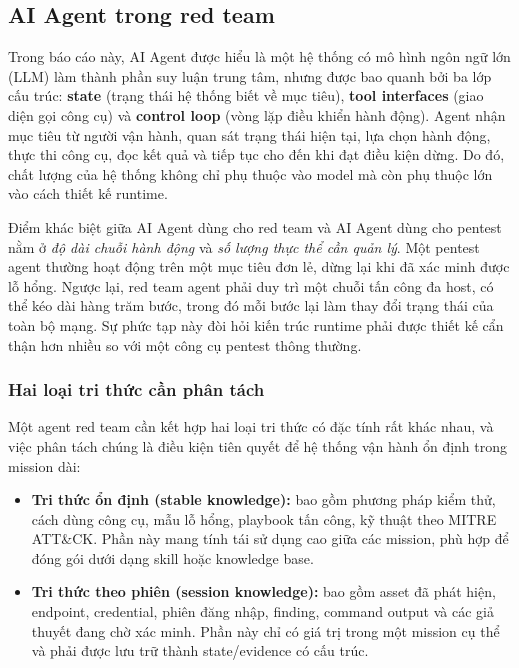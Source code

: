 
\subsection{AI Agent trong red team}
\label{sec:ai-agent-red-team}

Trong báo cáo này, AI Agent được hiểu là một hệ thống có mô hình ngôn ngữ lớn (LLM) làm thành phần suy luận trung tâm, nhưng được bao quanh bởi ba lớp cấu trúc: \textbf{state} (trạng thái hệ thống biết về mục tiêu), \textbf{tool interfaces} (giao diện gọi công cụ) và \textbf{control loop} (vòng lặp điều khiển hành động). Agent nhận mục tiêu từ người vận hành, quan sát trạng thái hiện tại, lựa chọn hành động, thực thi công cụ, đọc kết quả và tiếp tục cho đến khi đạt điều kiện dừng. Do đó, chất lượng của hệ thống không chỉ phụ thuộc vào model mà còn phụ thuộc lớn vào cách thiết kế runtime.

Điểm khác biệt giữa AI Agent dùng cho red team và AI Agent dùng cho pentest nằm ở \emph{độ dài chuỗi hành động} và \emph{số lượng thực thể cần quản lý}. Một pentest agent thường hoạt động trên một mục tiêu đơn lẻ, dừng lại khi đã xác minh được lỗ hổng. Ngược lại, red team agent phải duy trì một chuỗi tấn công đa host, có thể kéo dài hàng trăm bước, trong đó mỗi bước lại làm thay đổi trạng thái của toàn bộ mạng. Sự phức tạp này đòi hỏi kiến trúc runtime phải được thiết kế cẩn thận hơn nhiều so với một công cụ pentest thông thường.

\subsubsection*{Hai loại tri thức cần phân tách}

Một agent red team cần kết hợp hai loại tri thức có đặc tính rất khác nhau, và việc phân tách chúng là điều kiện tiên quyết để hệ thống vận hành ổn định trong mission dài:

\begin{itemize}
    \item \textbf{Tri thức ổn định (stable knowledge):} bao gồm phương pháp kiểm thử, cách dùng công cụ, mẫu lỗ hổng, playbook tấn công, kỹ thuật theo MITRE ATT\&CK. Phần này mang tính tái sử dụng cao giữa các mission, phù hợp để đóng gói dưới dạng skill hoặc knowledge base.
    \item \textbf{Tri thức theo phiên (session knowledge):} bao gồm asset đã phát hiện, endpoint, credential, phiên đăng nhập, finding, command output và các giả thuyết đang chờ xác minh. Phần này chỉ có giá trị trong một mission cụ thể và phải được lưu trữ thành state/evidence có cấu trúc.
\end{itemize}

